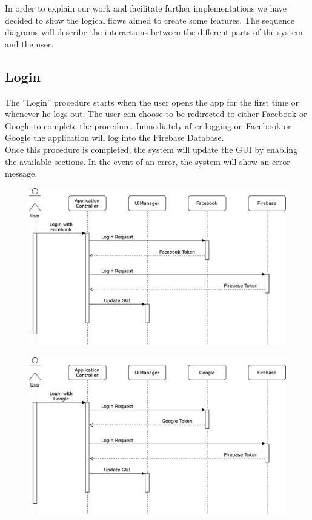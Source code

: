 In order to explain our work and facilitate further implementations we have decided to show the logical flows aimed to create some features. The sequence diagrams will describe the interactions between the different parts of the system and the user.

\vspace{8mm}

\subsection{Login}
The ”Login” procedure starts when the user opens the app for the first time or whenever he logs out. The user can choose to be redirected to either Facebook or Google to complete the procedure. Immediately after logging on Facebook or Google the application will log into the Firebase Database. \\
Once this procedure is completed, the system will update the GUI by enabling the available sections.
In the event of an error, the system will show an error message.

\vspace{5mm}

\begin{figure}[h]
\centering
\includegraphics[scale=0.2]{img/seqdiagrams/loginfacebook}
\end{figure}

\begin{figure}[h]
\centering
\includegraphics[scale=0.2]{img/seqdiagrams/logingoogle}
\end{figure}

